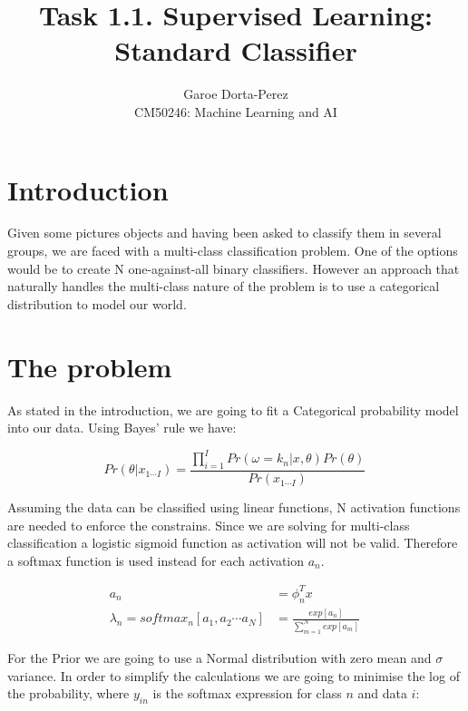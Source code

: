 \documentclass[12pt]{article}
\begin{document}
  
\title{Task 1.1. Supervised Learning: Standard Classifier}
\author{Garoe Dorta-Perez\\
CM50246: Machine Learning and AI}
 
\maketitle
 
\section{Introduction}
 
Given some pictures objects and having been asked to classify them in several groups, we are faced with a multi-class classification problem.
One of the options would be to create N one-against-all binary classifiers.
However an approach that naturally handles the multi-class nature of the problem is to use a categorical distribution to model our world. 

\section{The problem}

As stated in the introduction, we are going to fit a Categorical probability model into our data.
Using Bayes' rule we have:

\begin{equation}
\label{bayes}
Pr(\theta | x_{1 \cdots I}) = \frac{\prod_{i = 1}^{I} Pr(\omega = k_{n} | x, \theta) Pr(\theta)} {Pr(x_{1 \cdots I})}\,
\end{equation}

Assuming the data can be classified using linear functions, N activation functions are needed to enforce the constrains.
Since we are solving for multi-class classification a logistic sigmoid function as activation will not be valid.
Therefore a softmax function is used instead for each activation $a_{n}$.

\begin{align}
\label{activations}
a_{n} &= \phi_{n}^{T}x \\
\lambda_{n} = softmax_{n}[a_{1}, a_{2} \cdots a_{N}] &= 
\frac{exp[a_{n}]} {\sum_{m = 1}^{N} exp[a_{m}] }\,
\end{align}

For the Prior we are going to use a Normal distribution with zero mean and $\sigma$ variance.
In order to simplify the calculations we are going to minimise the log of the probability, where $y_{in}$ is the softmax expression for class $n$ and data $i$:
\end{document}
